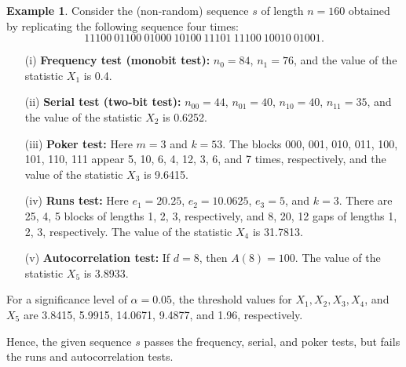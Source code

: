 \documentclass[12pt,openany]{book}
\theoremstyle{definition}
\newtheorem{example}{Example}[chapter]
\begin{document}
\begin{example}
	Consider the (non-random) sequence \( s \) of length \( n = 160 \) obtained by replicating the following sequence four times:
	\[ 11100\ 01100\ 01000\ 10100\ 11101\ 11100\ 10010\ 01001. \]
	
	\begin{enumerate}
		\item[(i)] \textbf{Frequency test (monobit test):} \( n_0 = 84 \), \( n_1 = 76 \), and the value of the statistic \( X_1 \) is 0.4.
		\item[(ii)] \textbf{Serial test (two-bit test):} \( n_{00} = 44 \), \( n_{01} = 40 \), \( n_{10} = 40 \), \( n_{11} = 35 \), and the value of the statistic \( X_2 \) is 0.6252.
		\item[(iii)] \textbf{Poker test:} Here \( m = 3 \) and \( k = 53 \). The blocks 000, 001, 010, 011, 100, 101, 110, 111 appear 5, 10, 6, 4, 12, 3, 6, and 7 times, respectively, and the value of the statistic \( X_3 \) is 9.6415.
		\item[(iv)] \textbf{Runs test:} Here \( e_1 = 20.25 \), \( e_2 = 10.0625 \), \( e_3 = 5 \), and \( k = 3 \). There are 25, 4, 5 blocks of lengths 1, 2, 3, respectively, and 8, 20, 12 gaps of lengths 1, 2, 3, respectively. The value of the statistic \( X_4 \) is 31.7813.
		\item[(v)] \textbf{Autocorrelation test:} If \( d = 8 \), then \( A(8) = 100 \). The value of the statistic \( X_5 \) is 3.8933.
	\end{enumerate}
	
	For a significance level of \( \alpha = 0.05 \), the threshold values for \( X_1, X_2, X_3, X_4 \), and \( X_5 \) are 3.8415, 5.9915, 14.0671, 9.4877, and 1.96, respectively. \par
	Hence, the given sequence \( s \) passes the frequency, serial, and poker tests, but fails the runs and autocorrelation tests.
	
	

\end{example}
\end{document}
